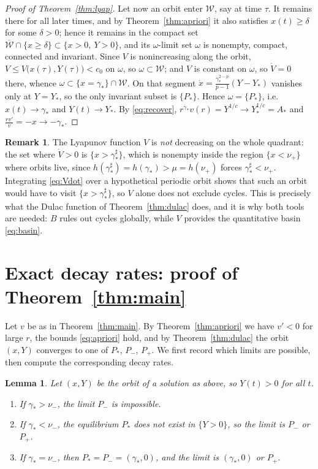 \documentclass[11pt,reqno]{amsart}
\numberwithin{equation}{section}
\theoremstyle{plain}
\newtheorem{lemma}[theorem]{Lemma}
\theoremstyle{definition}
\newtheorem{remark}[theorem]{Remark}
\newcommand{\gs}{\gamma_{*}}
\begin{document}
\begin{proof}[Proof of Theorem~\ref{thm:lyap}]
Let now an orbit enter $\mathcal W$, say at time $\tau$. It remains there for
all later times, and by Theorem~\ref{thm:apriori} it also satisfies
$x(t)\ge\delta$ for some $\delta>0$; hence it remains in the compact set
$\overline{\mathcal W}\cap\{x\ge\delta\}\subset\{x>0,\ Y>0\}$, and its
$\omega$-limit set $\omega$ is nonempty, compact, connected and invariant.
Since $V$ is nonincreasing along the orbit,
$V\le V\big(x(\tau),Y(\tau)\big)<c_{0}$ on $\omega$,
so $\omega\subset\mathcal W$; and $V$ is constant on $\omega$, so $\dot V=0$
there, whence $\omega\subset\{x=\gs\}\cap\mathcal W$. On that segment
$\dot x=\frac{\gs^{2-p}}{p-1}(Y-Y_{*})$ vanishes only at $Y=Y_{*}$, so the only
invariant subset is $\{P_{*}\}$. Hence $\omega=\{P_{*}\}$, i.e.\
$x(t)\to\gs$ and $Y(t)\to Y_{*}$. By \eqref{eq:recover},
$r^{\gs}v(r)=Y^{1/c}\to Y_{*}^{1/c}=A_{*}$ and $\frac{rv'}{v}=-x\to-\gs$.
\end{proof}

\begin{remark}\label{rem:cycles}
The Lyapunov function $V$ is \emph{not} decreasing on the whole quadrant: the
set where $\dot V>0$ is $\{x>\gs^{\sharp}\}$, which is nonempty inside the
region $\{x<\nu_{+}\}$ where orbits live, since $h(\gs^{\sharp})=h(\gs)>\mu
=h(\nu_{+})$ forces $\gs^{\sharp}<\nu_{+}$. Integrating \eqref{eq:Vdot} over a
hypothetical periodic orbit shows that such an orbit would have to visit
$\{x>\gs^{\sharp}\}$, so $V$ alone does not exclude cycles. This is precisely
what the Dulac function of Theorem~\ref{thm:dulac} does, and it is why both
tools are needed: $B$ rules out cycles globally, while $V$ provides the
quantitative basin \eqref{eq:basin}.
\end{remark}

\section{Exact decay rates: proof of Theorem~\ref{thm:main}}\label{sec:main}

Let $v$ be as in Theorem~\ref{thm:main}. By Theorem~\ref{thm:apriori} we have
$v'<0$ for large $r$, the bounds \eqref{eq:apriori} hold, and by
Theorem~\ref{thm:dulac} the orbit $(x,Y)$ converges to one of $P_{*}$,
$P_{-}$, $P_{+}$. We first record which limits are possible, then compute the
corresponding decay rates.

\begin{lemma}\label{lem:which}
Let $(x,Y)$ be the orbit of a solution as above, so $Y(t)>0$ for all $t$.
\begin{enumerate}
\item[(i)] If $\gs>\nu_{-}$, the limit $P_{-}$ is impossible.
\item[(ii)] If $\gs<\nu_{-}$, the equilibrium $P_{*}$ does not exist in
$\{Y>0\}$, so the limit is $P_{-}$ or $P_{+}$.
\item[(iii)] If $\gs=\nu_{-}$, then $P_{*}=P_{-}=(\gs,0)$, and the limit is
$(\gs,0)$ or $P_{+}$.
\end{enumerate}
\end{lemma}
\end{document}
